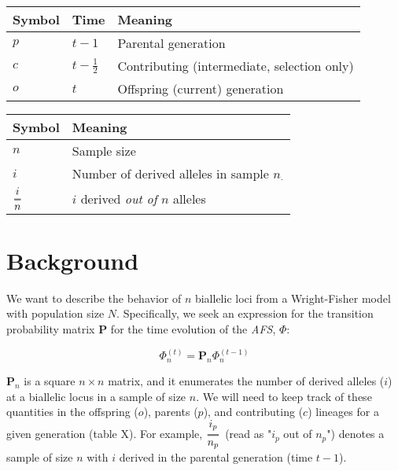 \documentclass[11pt]{article}
\begin{document}
\newcommand{\Dfrac}[2]{%
  \ooalign{%
    $\genfrac{}{}{1.2pt}0{#1}{#2}$\cr%
    $\color{white}\genfrac{}{}{.4pt}0{\phantom{#1}}{\phantom{#2}}$}%
}
\newcommand{\cond}{\middle\vert}



\begin{center}
\begin{tabular}{lll}
Symbol & Time & Meaning\\
\hline
$p$ & $t-1$ & Parental generation\\
$c$ & $t-\frac{1}{2}$ & Contributing (intermediate, selection only)\\
$o$ & $t$ & Offspring (current) generation\\
\end{tabular}
\end{center}



\begin{center}
\begin{tabular}{ll}
Symbol & Meaning\\
\hline
$n$ & Sample size\\
$i$ & Number of derived alleles in sample $n_{\cdot}$\\
$\Dfrac{i}{n}$ & $i$ derived \emph{out of} $n$ alleles\\
\end{tabular}
\end{center}


\section{Background}

We want to describe the behavior of $n$ biallelic loci from a Wright-Fisher model with population
size $N$. Specifically, we seek an expression for the transition probability matrix $\mathbf{P}$ for
the time evolution of the \emph{AFS}, $\Phi$:

\begin{equation}
  \label{eq:app:time-evolution}
  \Phi_n^{(t)} = \mathbf{P}_n \Phi_n^{(t-1)}
\end{equation}

$\mathbf{P}_n$ is a square $n \times n$ matrix, and it enumerates the number of derived alleles ($i$) at a
biallelic locus in a sample of size $n$. We will need to keep track of these quantities in the
offspring ($o$), parents ($p$), and contributing ($c$) lineages for a given generation (table X).
For example, $\Dfrac{i_p}{n_p}$ (read as "$i_p$ out of $n_p$") denotes a sample of size $n$ with $i$
derived in the parental generation (time $t-1$).
\end{document}
